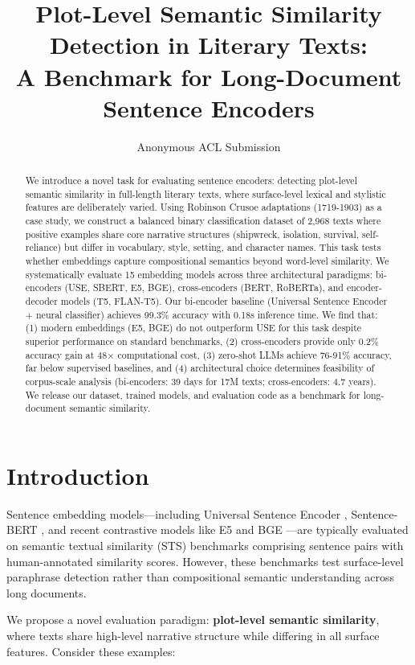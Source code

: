 \documentclass[11pt,a4paper]{article}
\title{Plot-Level Semantic Similarity Detection in Literary Texts:\\
A Benchmark for Long-Document Sentence Encoders}
\author{Anonymous ACL Submission}
\begin{document}
\maketitle

\begin{abstract}
We introduce a novel task for evaluating sentence encoders: detecting plot-level semantic similarity in full-length literary texts, where surface-level lexical and stylistic features are deliberately varied. Using Robinson Crusoe adaptations (1719-1903) as a case study, we construct a balanced binary classification dataset of 2,968 texts where positive examples share core narrative structures (shipwreck, isolation, survival, self-reliance) but differ in vocabulary, style, setting, and character names. This task tests whether embeddings capture compositional semantics beyond word-level similarity. We systematically evaluate 15 embedding models across three architectural paradigms: bi-encoders (USE, SBERT, E5, BGE), cross-encoders (BERT, RoBERTa), and encoder-decoder models (T5, FLAN-T5). Our bi-encoder baseline (Universal Sentence Encoder + neural classifier) achieves 99.3\% accuracy with 0.18s inference time. We find that: (1) modern embeddings (E5, BGE) do not outperform USE for this task despite superior performance on standard benchmarks, (2) cross-encoders provide only 0.2\% accuracy gain at 48× computational cost, (3) zero-shot LLMs achieve 76-91\% accuracy, far below supervised baselines, and (4) architectural choice determines feasibility of corpus-scale analysis (bi-encoders: 39 days for 17M texts; cross-encoders: 4.7 years). We release our dataset, trained models, and evaluation code as a benchmark for long-document semantic similarity.
\end{abstract}

\section{Introduction}

Sentence embedding models—including Universal Sentence Encoder \cite{Cer2018}, Sentence-BERT \cite{Reimers2019}, and recent contrastive models like E5 \cite{Wang2022} and BGE \cite{Xiao2023}—are typically evaluated on semantic textual similarity (STS) benchmarks \cite{Cer2017SemEval} comprising sentence pairs with human-annotated similarity scores. However, these benchmarks test surface-level paraphrase detection rather than compositional semantic understanding across long documents.

We propose a novel evaluation paradigm: \textbf{plot-level semantic similarity}, where texts share high-level narrative structure while differing in all surface features. Consider these examples:
\end{document}
